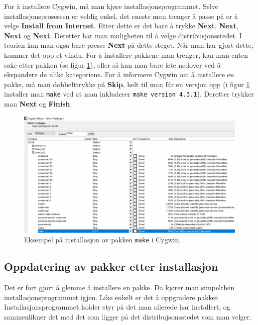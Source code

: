 For å installere Cygwin, må man kjøre installasjonsprogrammet. Selve installasjonsprosessen er veldig enkel, det eneste man trenger å passe på er å velge \textbf{Install from Internet}. Etter dette er det bare å trykke \textbf{Next}, \textbf{Next}, \textbf{Next} og \textbf{Next}. Deretter har man muligheten til å velge distribusjonsstedet. I teorien kan man også bare presse \textbf{Next} på dette steget. Når man har gjort dette, kommer det opp et vindu. For å installere pakkene man trenger, kan man enten søke etter pakken (se figur \ref{fig:Cygwin-setup}), eller så kan man bare lete nedover ved å ekspandere de ulike kategoriene. For å informere Cygwin om å installere en pakke, må man dobbelttrykke på \textbf{Skip}, helt til man får en versjon opp (i figur \ref{fig:Cygwin-setup} installer man \verb|make| ved at man inkluderer \verb|make version 4.3.1|). Deretter trykker man \textbf{Next} og \textbf{Finish}.

\begin{figure}[ht]
    \centering
    \includegraphics[scale=0.53]{figures/Capture.JPG}
    \caption{Eksempel på installasjon av pakken \texttt{make} i Cygwin.}
    \label{fig:Cygwin-setup}
\end{figure}

\subsection{Oppdatering av pakker etter installasjon}

Det er fort gjort å glemme å installere en pakke. Da kjører man simpelthen installasjonsprogrammet igjen. Like enkelt er det å oppgradere pakker. Installasjonsprogrammet holder styr på det man allerede har installert, og sammenlikner det med det som ligger på det distribujsonsstedet som man velger.
